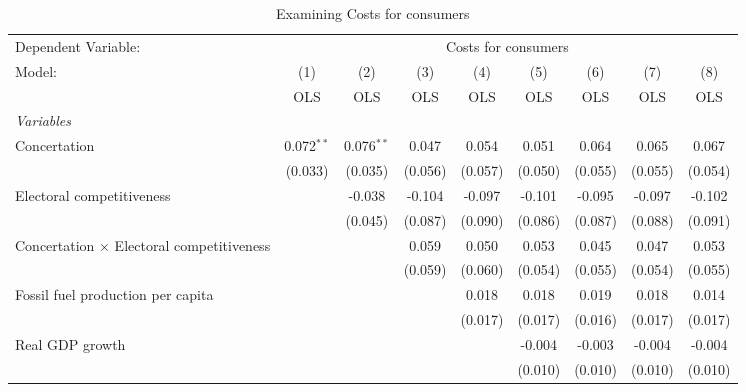 
\begin{table}[htbp]
   \caption{Examining Costs for consumers}
   \centering
   \begin{tabular}{lcccccccc}
      \toprule
      Dependent Variable: & \multicolumn{8}{c}{Costs for consumers}\\
      Model:                                           & (1)          & (2)          & (3)     & (4)     & (5)     & (6)     & (7)     & (8)\\  
                                                       &  OLS         & OLS          & OLS     & OLS     & OLS     & OLS     & OLS     & OLS\\  
      \midrule
      \emph{Variables}\\
      Concertation                                     & 0.072$^{**}$ & 0.076$^{**}$ & 0.047   & 0.054   & 0.051   & 0.064   & 0.065   & 0.067\\   
                                                       & (0.033)      & (0.035)      & (0.056) & (0.057) & (0.050) & (0.055) & (0.055) & (0.054)\\   
      Electoral competitiveness                        &              & -0.038       & -0.104  & -0.097  & -0.101  & -0.095  & -0.097  & -0.102\\   
                                                       &              & (0.045)      & (0.087) & (0.090) & (0.086) & (0.087) & (0.088) & (0.091)\\   
      Concertation $\times$ Electoral competitiveness  &              &              & 0.059   & 0.050   & 0.053   & 0.045   & 0.047   & 0.053\\   
                                                       &              &              & (0.059) & (0.060) & (0.054) & (0.055) & (0.054) & (0.055)\\   
      Fossil fuel production per capita                &              &              &         & 0.018   & 0.018   & 0.019   & 0.018   & 0.014\\   
                                                       &              &              &         & (0.017) & (0.017) & (0.016) & (0.017) & (0.017)\\   
      Real GDP growth                                  &              &              &         &         & -0.004  & -0.003  & -0.004  & -0.004\\   
                                                       &              &              &         &         & (0.010) & (0.010) & (0.010) & (0.010)\\   

\end{tabular}
\end{table}
